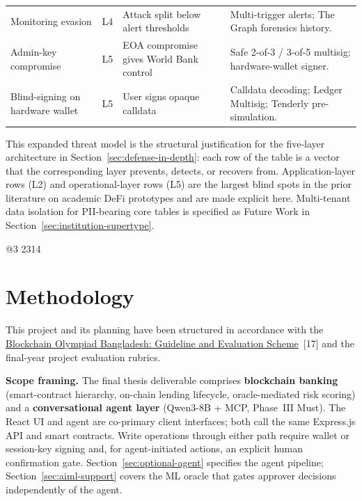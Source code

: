 \documentclass[12pt,a4paper]{report}
\begin{document}
\begin{table}[H]
\begin{tabular}{@{}p{2.3cm}p{1.1cm}p{3.6cm}p{5.8cm}@{}}
\rowcolor{RowShade}
Monitoring evasion & L4 & Attack split below alert thresholds & Multi-trigger alerts; The Graph forensics history. \\
Admin-key compromise & L5 & EOA compromise gives World Bank control & Safe 2-of-3 / 3-of-5 multisig; hardware-wallet signer. \\
\rowcolor{RowShade}
Blind-signing on hardware wallet & L5 & User signs opaque calldata & Calldata decoding; Ledger Multisig; Tenderly pre-simulation. \\
\bottomrule
\end{tabular}
\end{table}

This expanded threat model is the structural justification for the five-layer architecture in Section~\ref{sec:defense-in-depth}: each row of the table is a vector that the corresponding layer prevents, detects, or recovers from. Application-layer rows (L2) and operational-layer rows (L5) are the largest blind spots in the prior literature on academic DeFi prototypes and are made explicit here. Multi-tenant data isolation for PII-bearing core tables is specified as Future Work in Section~\ref{sec:institution-supertype}.

@3 2314 
\chapter{Methodology}

This project and its planning have been structured in accordance with the \href{https://bcolbd.org/uploads/guideline/BLOCKCHAIN\%20OLYMPIAD\%20BANGLADESH\%20Blockchain\%20Guideline.pdf}{Blockchain Olympiad Bangladesh: Guideline and Evaluation Scheme}~[17] and the final-year project evaluation rubrics.

\noindent\textbf{Scope framing.} The final thesis deliverable comprises \textbf{blockchain banking} (smart-contract hierarchy, on-chain lending lifecycle, oracle-mediated risk scoring) and a \textbf{conversational agent layer} (Qwen3-8B + MCP, Phase~III Must). The React UI and agent are co-primary client interfaces; both call the same Express.js API and smart contracts. Write operations through either path require wallet or session-key signing and, for agent-initiated actions, an explicit human confirmation gate. Section~\ref{sec:optional-agent} specifies the agent pipeline; Section~\ref{sec:aiml-support} covers the ML oracle that gates approver decisions independently of the agent.
\end{document}
